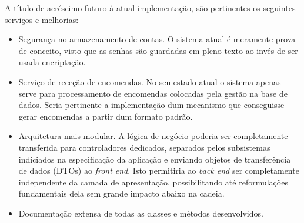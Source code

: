        A título de acréscimo futuro à atual implementação, são pertinentes os seguintes serviços e melhorias:
        \begin{itemize}
            \item Segurança no armazenamento de contas. O sistema atual é meramente prova de conceito, visto que as senhas são guardadas em pleno texto ao invés de ser usada encriptação.
            \item Serviço de receção de encomendas. No seu estado atual o sistema apenas serve para processamento de encomendas colocadas pela gestão na base de dados. Seria pertinente a implementação dum mecanismo que conseguisse gerar encomendas a partir dum formato padrão.
            \item Arquitetura mais modular. A lógica de negócio poderia ser completamente transferida para controladores dedicados, separados pelos subsistemas indiciados na especificação da aplicação e enviando objetos de transferência de dados (DTOs) ao \textit{front end}. Isto permitiria ao \textit{back end} ser completamente independente da camada de apresentação, possibilitando até reformulações fundamentais dela sem grande impacto abaixo na cadeia.
            \item Documentação extensa de todas as classes e métodos desenvolvidos.
        \end{itemize}
        
